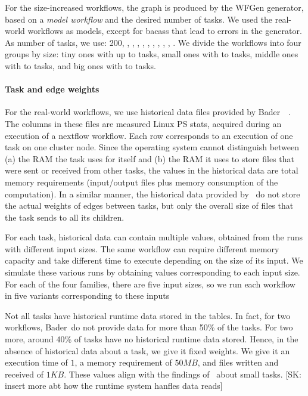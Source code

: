 \documentclass[conference]{IEEEtran}
\newcommand{\skug}[1]{{\color{blue}[SK: #1]}}
\begin{document}
    For the size-increased workflows, the graph is produced by the WFGen generator, based on a {\em model workflow} and
    the desired number of tasks.
    We used the real-world workflows as models, except for bacass that lead to errors in the generator.
%
    As number of tasks, we use: 200, , , , , ,
    , , , , .
    We divide the workflows into four groups by size: tiny ones with up to  tasks, small ones with  to  tasks,
    middle ones with  to  tasks, and big ones with  to  tasks.

    \paragraph{Task and edge weights}
    For the real-world workflows, we use historical data files provided by Bader~\etal~\cite{lotaru}.
    The columns in these files are measured Linux PS stats, acquired during an execution of a nextflow workflow.
    Each row corresponds to an execution of one task on one cluster node.
    Since the operating system cannot distinguish between (a) the RAM the task uses for itself and (b) the RAM it uses
    to store files that were sent or received from other tasks, the values in the historical data are total memory requirements (input/output files plus memory consumption of the computation).
    In a similar manner, the historical data provided by~\cite{lotaru} do not store the actual weights of edges between tasks, but only the overall
    size of files that the task sends to all its children.

    For each task, historical data can contain multiple values, obtained from the runs with different input sizes.
    The same workflow can require different memory capacity and take different time to execute
    depending on the size of its input.
    We simulate these various runs by obtaining values corresponding to each input size.
    For each of the four families, there are five input sizes, so we run each workflow in five variants corresponding to these inputs

    Not all tasks have historical runtime data stored in the tables.
    In fact, for two workflows, Bader~\etal do not provide data for more than 50\% of the tasks.
    For two more, around 40\% of tasks have no historical runtime data stored.
    Hence, in the absence of historical data about a task, we give it fixed weights.
    We give it an execution time of $1$, a memory requirement of $50 MB$, and files written and received of $1KB$.
    These values align with the findings of~\cite{lotaru} about small tasks.
%
    \skug{insert more abt how the runtime system hanfles data reads}
\end{document}
